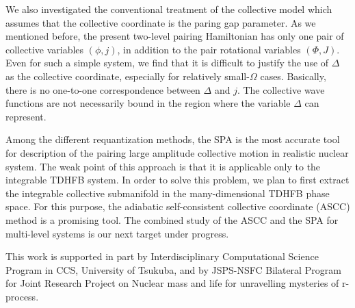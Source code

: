 \documentclass[%
superscriptaddress,
preprint,
showpacs,
nofootinbib,
amsmath,amssymb,
aps,
prc,
floatfix ]%
{revtex4-1}
\begin{document}
We also investigated the conventional treatment of
the collective model which assumes that the collective coordinate is
the paring gap parameter.
As we mentioned before, the present two-level pairing Hamiltonian has
only one pair of collective variables $(\phi,j)$, in addition to the
pair rotational variables $(\Phi,J)$.
Even for such a simple system, we find that it is difficult to justify
the use of $\Delta$ as the collective coordinate,
especially for relatively small-$\Omega$ cases.
Basically, there is no one-to-one correspondence between $\Delta$ and $j$.
The collective wave functions are not necessarily bound in the region
where the variable $\Delta$ can represent.


Among the different requantization methods,
the SPA is the most accurate tool for description of
the pairing large amplitude collective motion in realistic nuclear system.
The weak point of this approach is that it is applicable only to the
integrable TDHFB system.
In order to solve this problem, we plan to first extract the
integrable collective submanifold in the many-dimensional TDHFB phase space.
For this purpose, the adiabatic self-consistent collective coordinate (ASCC)
method \cite{NMMY16} is a promising tool.
The combined study of the ASCC and the SPA for multi-level systems is our
next target under progress.

\begin{acknowledgments}
This work is supported in part
by Interdisciplinary Computational Science Program in CCS,
University of Tsukuba,
and
by JSPS-NSFC Bilateral Program for Joint Research Project
on Nuclear mass and life for unravelling mysteries of r-process.
\end{acknowledgments}
\end{document}
